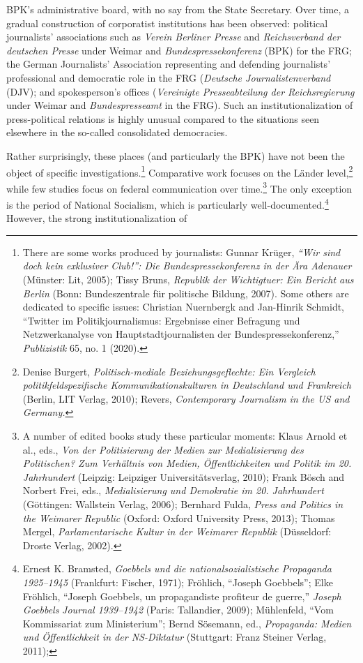 \documentclass{tufte-handout}
\begin{document}
BPK's administrative board, with no say from the State Secretary. Over
time, a gradual construction of corporatist institutions has been
observed: political journalists' associations such as \emph{Verein
Berliner Presse} and \emph{Reichsverband der deutschen Presse} under
Weimar and \emph{Bundespressekonferenz} (BPK) for the FRG; the German
Journalists' Association representing and defending journalists'
professional and democratic role in the FRG (\emph{Deutsche
Journalistenverband} (DJV); and spokesperson's offices (\emph{Vereinigte
Presseabteilung der Reichsregierung} under Weimar and
\emph{Bundespresseamt} in the FRG). Such an institutionalization of
press-political relations is highly unusual compared to the situations
seen elsewhere in the so-called consolidated democracies.

Rather surprisingly, these places (and particularly the BPK) have not
been the object of specific investigations.\footnote{There are some
  works produced by journalists: Gunnar Krüger, \emph{``Wir sind doch
  kein exklusiver Club!'': Die Bundespressekonferenz in der Ära
  Adenauer} (Münster: Lit, 2005); Tissy Bruns, \emph{Republik der
  Wichtigtuer: Ein Bericht aus Berlin} (Bonn: Bundeszentrale für
  politische Bildung, 2007). Some others are dedicated to specific
  issues: Christian Nuernbergk and Jan-Hinrik Schmidt, ``Twitter im
  Politikjournalismus: Ergebnisse einer Befragung und Netzwerkanalyse
  von Hauptstadtjournalisten der Bundespressekonferenz,''
  \emph{Publizistik} 65, no. 1 (2020).} Comparative work focuses on the
Länder level,\footnote{Denise Burgert, \emph{Politisch-mediale
  Beziehungsgeflechte: Ein Vergleich politikfeldspezifische
  Kommunikationskulturen in Deutschland und Frankreich} (Berlin, LIT
  Verlag, 2010); Revers, \emph{Contemporary Journalism in the US and
  Germany.}} while few studies focus on federal communication over
time.\footnote{A number of edited books study these particular moments:
  Klaus Arnold et al., eds., \emph{Von der Politisierung der Medien zur
  Medialisierung des Politischen? Zum Verhältnis von Medien,
  Öffentlichkeiten und Politik im 20. Jahrhundert} (Leipzig: Leipziger
  Universitätsverlag, 2010); Frank Bösch and Norbert Frei, eds.,
  \emph{Medialisierung und Demokratie im 20. Jahrhundert} (Göttingen:
  Wallstein Verlag, 2006); Bernhard Fulda, \emph{Press and Politics in
  the Weimarer Republic} (Oxford: Oxford University Press, 2013); Thomas
  Mergel, \emph{Parlamentarische Kultur in der Weimarer Republik}
  (Düsseldorf: Droste Verlag, 2002).} The only exception is the period
of National Socialism, which is particularly well-documented.\footnote{Ernest
  K. Bramsted, \emph{Goebbels und die nationalsozialistische Propaganda
  1925--1945} (Frankfurt: Fischer, 1971); Fröhlich, ``Joseph Goebbels'';
  Elke Fröhlich, ``Joseph Goebbels, un propagandiste profiteur de
  guerre,'' \emph{Joseph Goebbels} \emph{Journal 1939­--1942} (Paris:
  Tallandier, 2009); Mühlenfeld, ``Vom Kommissariat zum Ministerium'';
  Bernd Sösemann, ed., \emph{Propaganda: Medien und Öffentlichkeit in
  der NS-Diktatur} (Stuttgart: Franz Steiner Verlag, 2011);} However, the strong institutionalization of
\end{document}
